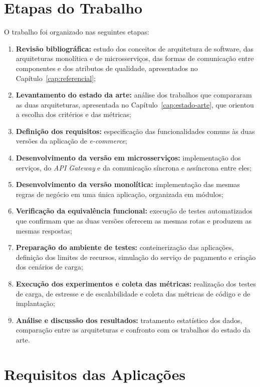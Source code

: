 \section{Etapas do Trabalho}

O trabalho foi organizado nas seguintes etapas:

\begin{enumerate}
    \item \textbf{Revisão bibliográfica:} estudo dos conceitos de arquitetura de software, das
    arquiteturas monolítica e de microsserviços, das formas de comunicação entre componentes e
    dos atributos de qualidade, apresentados no Capítulo~\ref{cap:referencial};
    \item \textbf{Levantamento do estado da arte:} análise dos trabalhos que compararam as duas
    arquiteturas, apresentada no Capítulo~\ref{cap:estado-arte}, que orientou a escolha dos
    critérios e das métricas;
    \item \textbf{Definição dos requisitos:} especificação das funcionalidades comuns às duas
    versões da aplicação de \textit{e-commerce};
    \item \textbf{Desenvolvimento da versão em microsserviços:} implementação dos serviços, do
    \textit{API Gateway} e da comunicação síncrona e assíncrona entre eles;
    \item \textbf{Desenvolvimento da versão monolítica:} implementação das mesmas regras de
    negócio em uma única aplicação, organizada em módulos;
    \item \textbf{Verificação da equivalência funcional:} execução de testes automatizados que
    confirmam que as duas versões oferecem as mesmas rotas e produzem as mesmas respostas;
    \item \textbf{Preparação do ambiente de testes:} conteinerização das aplicações, definição
    dos limites de recursos, simulação do serviço de pagamento e criação dos cenários de carga;
    \item \textbf{Execução dos experimentos e coleta das métricas:} realização dos testes de
    carga, de estresse e de escalabilidade e coleta das métricas de código e de implantação;
    \item \textbf{Análise e discussão dos resultados:} tratamento estatístico dos dados,
    comparação entre as arquiteturas e confronto com os trabalhos do estado da arte.
\end{enumerate}

\section{Requisitos das Aplicações}

